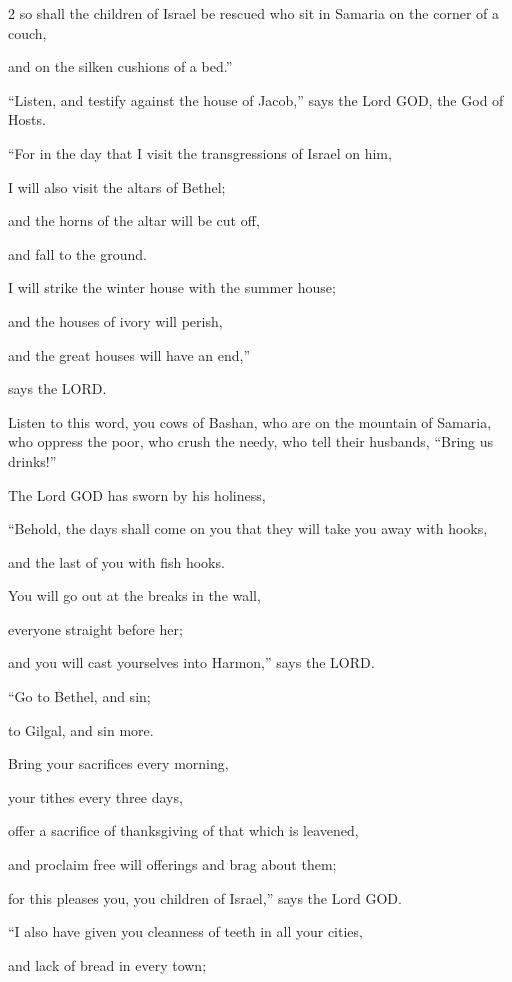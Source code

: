 \begin{multicols}{2}
	so shall the children of Israel be rescued who sit in Samaria on the corner of
	a couch,
	
	and on the silken cushions of a bed.”
	
	\myverse{}“Listen, and testify against the house of Jacob,” says the Lord
	GOD, the God of Hosts.
	
	\myverse{}“For in the day that I visit the transgressions of Israel on
	him,
	
	I will also visit the altars of Bethel;
	
	and the horns of the altar will be cut off,
	
	and fall to the ground.
	
	\myverse{}I will strike the winter house with the summer house;
	
	and the houses of ivory will perish,
	
	and the great houses will have an end,”
	
	says the LORD.
	
	
	\mychapter{} \myverse*{}Listen to this word, you cows of Bashan, who are on the mountain
	of Samaria, who oppress the poor, who crush the needy, who tell their husbands, “Bring us drinks!”
	
	\myverse{}The Lord GOD has sworn by his holiness,
	
	“Behold, the days shall come on you that they will take you away with hooks,
	
	and the last of you with fish hooks.
	
	\myverse{}You will go out at the breaks in the wall,
	
	everyone straight before her;
	
	and you will cast yourselves into Harmon,” says the LORD.
	
	\myverse{}“Go to Bethel, and sin;
	
	to Gilgal, and sin more.
	
	Bring your sacrifices every morning,
	
	your tithes every three days,
	
	\myverse{}offer a sacrifice of thanksgiving of that which is leavened,
	
	and proclaim free will offerings and brag about them;
	
	for this pleases you, you children of Israel,” says the Lord GOD.
	
	\myverse{}“I also have given you cleanness of teeth in all your cities,
	
	and lack of bread in every town;
	

\end{multicols}
